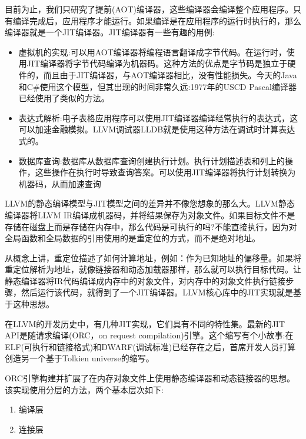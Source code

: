 目前为止，我们只研究了提前(AOT)编译器，这些编译器会编译整个应用程序。只有编译完成后，应用程序才能运行。如果编译是在应用程序的运行时执行的，那么编译器就是一个JIT编译器。JIT编译器有一些有趣的用例:\par

\begin{itemize}
\item 虚拟机的实现:可以用AOT编译器将编程语言翻译成字节代码。在运行时，使用JIT编译器将字节代码编译为机器码。这种方法的优点是字节码是独立于硬件的，而且由于JIT编译器，与AOT编译器相比，没有性能损失。今天的Java和C\#使用这个模型，但其出现的时间非常久远:1977年的USCD Pascal编译器已经使用了类似的方法。

\item 表达式解析:电子表格应用程序可以使用JIT编译器编译经常执行的表达式，这可以加速金融模拟。LLVM调试器LLDB就是使用这种方法在调试时计算表达式的。

\item 数据库查询:数据库从数据库查询创建执行计划。执行计划描述表和列上的操作，这些操作在执行时导致查询答案。可以使用JIT编译器将执行计划转换为机器码，从而加速查询
\end{itemize}

LLVM的静态编译模型与JIT模型之间的差异并不像您想象的那么大。LLVM静态编译器将LLVM IR编译成机器码，并将结果保存为对象文件。如果目标文件不是存储在磁盘上而是存储在内存中，那么代码是可执行的吗?不能直接执行，因为对全局函数和全局数据的引用使用的是重定位的方式，而不是绝对地址。\par

从概念上讲，重定位描述了如何计算地址，例如：作为已知地址的偏移量。如果将重定位解析为地址，就像链接器和动态加载器那样，那么就可以执行目标代码。让静态编译器将IR代码编译成内存中的对象文件，对内存中的对象文件执行链接步骤，然后运行该代码，就得到了一个JIT编译器。LLVM核心库中的JIT实现就是基于这种思想。\par

在LLVM的开发历史中，有几种JIT实现，它们具有不同的特性集。最新的JIT API是随请求编译(ORC，on request compilation)引擎。这个缩写有个小故事:在ELF(可执行和链接格式)和DWARF(调试标准)已经存在之后，首席开发人员打算创造另一个基于Tolkien universe的缩写。\par

ORC引擎构建并扩展了在内存对象文件上使用静态编译器和动态链接器的思想。该实现使用分层的方法，两个基本层次如下:\par

\begin{enumerate}
\item 编译层 
\item 连接层
\end{enumerate}

